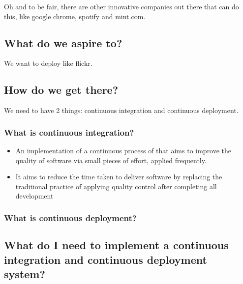 \documentclass{article}
\begin{document}
Oh and to be fair, there are other innovative companies out there that
can do this, like google chrome, spotify and mint.com.

\subsection{What do we aspire to?}

We want to deploy like flickr.


\subsection{How do we get there?}

We need to have 2 things: continuous integration and continuous
deployment.

\subsubsection*{What is continuous integration?}
\begin{itemize}
  \item An implementation of a continuous process of that aims to
    improve the quality of software via small pieces of effort,
    applied frequently.
  \item It aims to reduce the time taken to deliver software by
    replacing the traditional practice of applying quality control
    after completing all development
\end{itemize}

\subsubsection*{What is continuous deployment?}

\subsection{What do I need to implement a continuous integration and continuous deployment system?}
\end{document}
